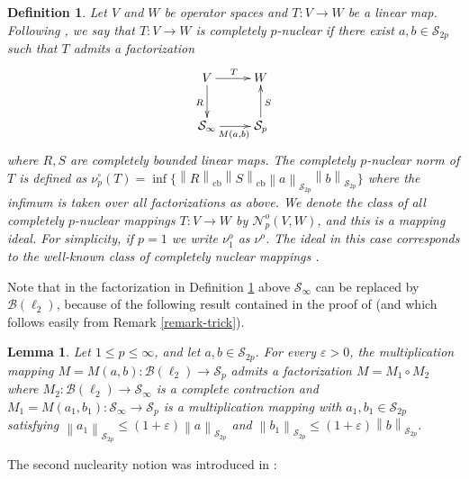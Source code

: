 \documentclass[11pt]{amsart}
\DeclareMathOperator{\cb}{cb}
\newcommand{\n}[1]{ \left\|#1\right\| }
\newtheorem{lemma}[theorem]{Lemma}
\newtheorem{definition}[theorem]{Definition}
\numberwithin{equation}{section}
\begin{document}
\begin{definition}\label{defn-completely-p-nuclear}
Let $V$ and $W$ be operator spaces and $T : V \to W$ be a linear map.
Following \cite[Def. 3.1.3.1]{Junge-Habilitationschrift},
we say that $T : V \to W$ is \emph{completely $p$-nuclear} if there exist $a,b \in \mathcal{S}_{2p}$ such that $T$  admits a factorization
$$
\xymatrix{
V \ar[r]^T \ar[d]_{R} &W \\
\mathcal{S}_{\infty} \ar[r]_{M(a,b)} &\mathcal{S}_p \ar[u]_{S}
}
$$
where $R,S$ are completely bounded linear maps.
The completely $p$-nuclear norm of $T$ is defined as
$
\nu_p^{\circ}(T) = \inf \big\{ \n{R}_{\cb} \n{S}_{\cb}  \n{a}_{\mathcal{S}_{2p}} \n{b}_{\mathcal{S}_{2p}}  \big\}
$
where the infimum is taken over all factorizations as above.
We denote the class of all completely $p$-nuclear mappings $T:V \to W$ by $\mathcal N_p^o(V,W)$,  and this is a mapping ideal. For simplicity, if $p=1$ we write $\nu_1^o$ as $\nu^o$. The ideal in this case corresponds to the well-known class of completely nuclear mappings \cite[Sec. 12.2]{Effros-Ruan-book}.
\end{definition}

Note that in the factorization in Definition \ref{defn-completely-p-nuclear} above $\mathcal{S}_\infty$ can be replaced by $\mathcal{B}(\ell_2)$, because of the following result 
contained in the proof of \cite[Lem. 6.4]{CD-completely-mixing} (and which follows easily from Remark \ref{remark-trick}).

\begin{lemma}\label{lemma:multiplication-operator-on-B(ell_2)}
Let $1 \le p \le \infty$, and let $a,b\in \mathcal{S}_{2p}$. For every $\varepsilon>0$, the multiplication mapping $M=M(a,b) : \mathcal{B}(\ell_2) \to \mathcal{S}_p$ admits a factorization $M = M_1 \circ M_2$ where $M_2 : \mathcal{B}(\ell_2) \to \mathcal{S}_\infty$ is a complete contraction and  $M_1= M(a_1,b_1) : \mathcal{S}_\infty \to \mathcal{S}_p$ is a multiplication mapping with $a_1 , b_1 \in \mathcal{S}_{2p}$ satisfying $\n{a_1}_{\mathcal{S}_{2p}} \le (1+\varepsilon)\n{a}_{\mathcal{S}_{2p}}$ and $\n{b_1}_{\mathcal{S}_{2p}} \le (1+\varepsilon)\n{b}_{\mathcal{S}_{2p}}$.
\end{lemma}


The second nuclearity notion was introduced in \cite{ChaDiGa-Operator-p-compact}:
\end{document}
